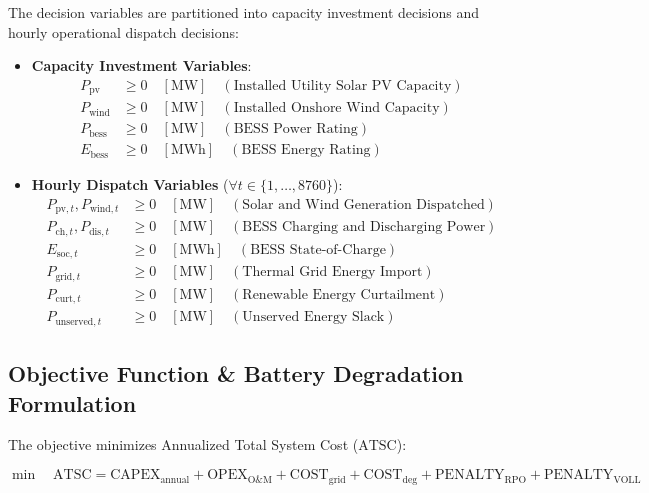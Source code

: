 \documentclass[11pt,a4paper]{article}
\begin{document}
The decision variables are partitioned into capacity investment decisions and hourly operational dispatch decisions:
\begin{itemize}
    \item \textbf{Capacity Investment Variables}:
    \begin{align}
    P_{\text{pv}} &\ge 0 \quad [\text{MW}] \quad (\text{Installed Utility Solar PV Capacity}) \\
    P_{\text{wind}} &\ge 0 \quad [\text{MW}] \quad (\text{Installed Onshore Wind Capacity}) \\
    P_{\text{bess}} &\ge 0 \quad [\text{MW}] \quad (\text{BESS Power Rating}) \\
    E_{\text{bess}} &\ge 0 \quad [\text{MWh}] \quad (\text{BESS Energy Rating})
    \end{align}
    \item \textbf{Hourly Dispatch Variables} ($\forall t \in \{1, \dots, 8760\}$):
    \begin{align}
    P_{\text{pv},t}, P_{\text{wind},t} &\ge 0 \quad [\text{MW}] \quad (\text{Solar and Wind Generation Dispatched}) \\
    P_{\text{ch},t}, P_{\text{dis},t} &\ge 0 \quad [\text{MW}] \quad (\text{BESS Charging and Discharging Power}) \\
    E_{\text{soc},t} &\ge 0 \quad [\text{MWh}] \quad (\text{BESS State-of-Charge}) \\
    P_{\text{grid},t} &\ge 0 \quad [\text{MW}] \quad (\text{Thermal Grid Energy Import}) \\
    P_{\text{curt},t} &\ge 0 \quad [\text{MW}] \quad (\text{Renewable Energy Curtailment}) \\
    P_{\text{unserved},t} &\ge 0 \quad [\text{MW}] \quad (\text{Unserved Energy Slack})
    \end{align}
\end{itemize}

\subsection{Objective Function \& Battery Degradation Formulation}
\label{sec:obj}

The objective minimizes Annualized Total System Cost ($\text{ATSC}$):

\begin{equation}
\min \quad \text{ATSC} = \text{CAPEX}_{\text{annual}} + \text{OPEX}_{\text{O\&M}} + \text{COST}_{\text{grid}} + \text{COST}_{\text{deg}} + \text{PENALTY}_{\text{RPO}} + \text{PENALTY}_{\text{VOLL}}
\label{eq:obj}
\end{equation}
\end{document}
